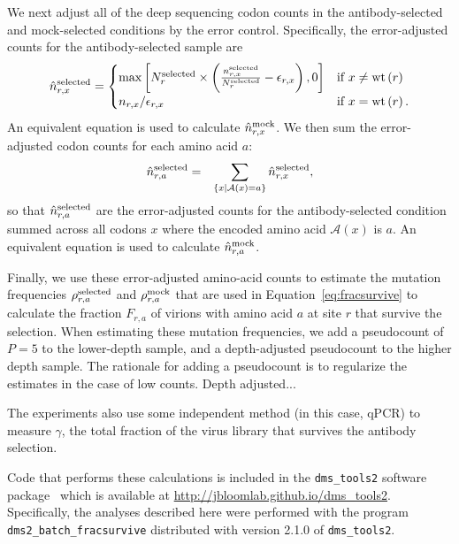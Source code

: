 \documentclass[11pt]{article}
\begin{document}
We next adjust all of the deep sequencing codon counts in the antibody-selected and mock-selected conditions by the error control. 
Specifically, the error-adjusted counts for the antibody-selected sample are
\begin{equation}
\label{eq:erroradjust}
\hat{n}_{r,x} ^{\rm{selected}}= \begin{cases}
\max\left[N_r^{\rm{selected}} \times \left(\frac{n_{r,x}^{\rm{selected}}}{N_r^{\rm{selected}}} - \epsilon_{r,x}\right), 0\right] & \mbox{if } x \ne \operatorname{wt}\left(r\right) \\
n_{r,x} / \epsilon_{r,x} & \mbox{if } x = \operatorname{wt}\left(r\right).
\end{cases}
\end{equation}
An equivalent equation is used to calculate $\hat{n}_{r,x} ^{\rm{mock}}$.
We then sum the error-adjusted codon counts for each amino acid $a$:
\begin{eqnarray}
\hat{n}_{r,a}^{\rm{selected}} &=& \sum\limits_{\left\{x \mid \mathcal{A}\left(x\right) = a\right\}} \hat{n}_{r,x}^{\rm{selected}},
\end{eqnarray}
so that $\hat{n}_{r,a}^{\rm{selected}}$ are the error-adjusted counts for the antibody-selected condition summed across all codons $x$ where the encoded amino acid $\mathcal{A}\left(x\right)$ is $a$.
An equivalent equation is used to calculate $\hat{n}_{r,a} ^{\rm{mock}}$.

Finally, we use these error-adjusted amino-acid counts to estimate the mutation frequencies $\rho_{r,a}^{\rm{selected}}$ and $\rho_{r,a}^{\rm{mock}}$ that are used in Equation~\ref{eq:fracsurvive} to calculate the fraction $F_{r,a}$ of virions with amino acid $a$ at site $r$ that survive the selection.
When estimating these mutation frequencies, we add a pseudocount of $P = 5$ to the lower-depth sample, and a depth-adjusted pseudocount to the higher depth sample.
The rationale for adding a pseudocount is to regularize the estimates in the case of low counts.
Depth adjusted...

The experiments also use some independent method (in this case, qPCR) to measure $\gamma$, the total fraction of the virus library that survives the antibody selection.


Code that performs these calculations is included in the \texttt{dms\_tools2} software package~\citep{bloom2015software} which is available at \url{http://jbloomlab.github.io/dms_tools2}.
Specifically, the analyses described here were performed with the program \texttt{dms2\_batch\_fracsurvive} distributed with version 2.1.0 of \texttt{dms\_tools2}.
\end{document}
